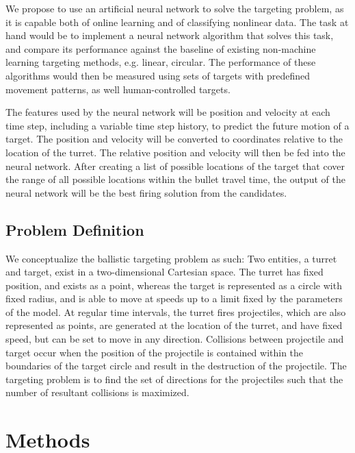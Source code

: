 \documentclass[11pt,letterpaper]{article}
\begin{document}
We propose to use an artificial neural network to solve the targeting problem, as it is capable both of online learning and of classifying nonlinear data. The task at hand would be to implement a neural network algorithm that solves this task, and compare its performance against the baseline of existing non-machine learning targeting methods, e.g. linear, circular. The performance of these algorithms would then be measured using sets of targets with predefined movement patterns, as well human-controlled targets.

The features used by the neural network will be position and velocity at each time step, including a variable time step history, to predict the future motion of a target. The position and velocity will be converted to coordinates relative to the location of the turret. The relative position and velocity will then be fed into the neural network. After creating a list of possible locations of the target that cover the range of all possible locations within the bullet travel time, the output of the neural network will be the best firing solution from the candidates.

\subsection{Problem Definition}
We conceptualize the ballistic targeting problem as such:
Two entities, a turret and target, exist in a two-dimensional Cartesian space. The turret has fixed position, and exists as a point, whereas the target is represented as a circle with fixed radius, and is able to move at speeds up to a limit fixed by the parameters of the model. At regular time intervals, the turret fires projectiles, which are also represented as points, are generated at the location of the turret, and have fixed speed, but can be set to move in any direction. Collisions between projectile and target occur when the position of the projectile is contained within the boundaries of the target circle and result in the destruction of the projectile. The targeting problem is to find the set of directions for the projectiles such that the number of resultant collisions is maximized.
\section{Methods}
\end{document}
